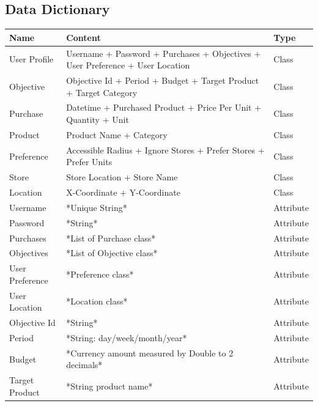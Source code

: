 \documentclass[12pt]{article}
\begin{document}
\subsection{Data Dictionary}
\begin{longtable}{| >{\raggedright\arraybackslash}p{} | >{\raggedright\arraybackslash}p{} | >{\raggedright\arraybackslash}p{} |}
        \hline
        \textbf{Name} & \textbf{Content} & \textbf{Type} \\
        \hline
        User Profile & Username + Password + Purchases + Objectives + User Preference + User Location & Class \\
        \hline
        Objective & Objective Id + Period + Budget + Target Product + Target Category & Class \\
        \hline
        Purchase & Datetime + Purchased Product + Price Per Unit + Quantity + Unit & Class \\
        \hline
        Product & Product Name + Category & Class \\
        \hline
        Preference & Accessible Radius + Ignore Stores + Prefer Stores + Prefer Units & Class \\
        \hline
        Store & Store Location + Store Name & Class \\
        \hline
        Location & X-Coordinate + Y-Coordinate & Class \\
        \hline
        Username & *Unique String* & Attribute\\
        \hline
        Password & *String* & Attribute \\
        \hline
        Purchases & *List of Purchase class* & Attribute \\
        \hline
        Objectives & *List of Objective class* & Attribute \\
        \hline
        User Preference & *Preference class* & Attribute \\
        \hline
        User Location & *Location class* & Attribute \\
        \hline
        Objective Id & *String* & Attribute \\
        \hline
        Period & *String: day/week/month/year* & Attribute\\
        \hline
        Budget & *Currency amount measured by Double to 2 decimals* & Attribute \\
        \hline
        Target Product & *String product name* & Attribute \\
        \hline 

\end{longtable}
\end{document}
